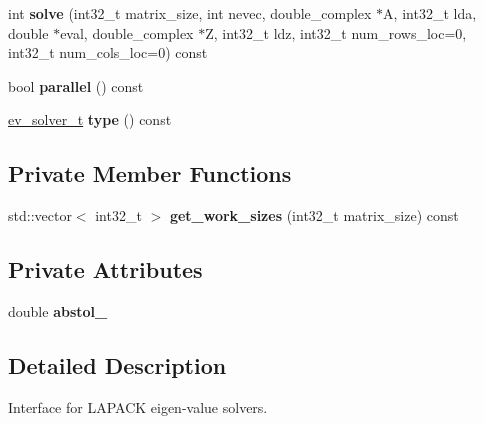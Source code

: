 \begin{DoxyCompactItemize}
\item 
\hypertarget{class_eigenproblem__lapack_a763608ccdddc644d840605a0627e00a1}{}int {\bfseries solve} (int32\+\_\+t matrix\+\_\+size, int nevec, double\+\_\+complex $\ast$A, int32\+\_\+t lda, double $\ast$eval, double\+\_\+complex $\ast$Z, int32\+\_\+t ldz, int32\+\_\+t num\+\_\+rows\+\_\+loc=0, int32\+\_\+t num\+\_\+cols\+\_\+loc=0) const \label{class_eigenproblem__lapack_a763608ccdddc644d840605a0627e00a1}

\item 
\hypertarget{class_eigenproblem__lapack_a50570856389dad526f5985ea3f14c431}{}bool {\bfseries parallel} () const \label{class_eigenproblem__lapack_a50570856389dad526f5985ea3f14c431}

\item 
\hypertarget{class_eigenproblem__lapack_adfdb06da092e1e7cca33e142ab5e47a1}{}\hyperlink{eigenproblem_8h_a203f2c57422a6e64834e6e9ab85982bf}{ev\+\_\+solver\+\_\+t} {\bfseries type} () const \label{class_eigenproblem__lapack_adfdb06da092e1e7cca33e142ab5e47a1}

\end{DoxyCompactItemize}
\subsection*{Private Member Functions}
\begin{DoxyCompactItemize}
\item 
\hypertarget{class_eigenproblem__lapack_a89e330901880cfc0b3403ad5f4436914}{}std\+::vector$<$ int32\+\_\+t $>$ {\bfseries get\+\_\+work\+\_\+sizes} (int32\+\_\+t matrix\+\_\+size) const \label{class_eigenproblem__lapack_a89e330901880cfc0b3403ad5f4436914}

\end{DoxyCompactItemize}
\subsection*{Private Attributes}
\begin{DoxyCompactItemize}
\item 
\hypertarget{class_eigenproblem__lapack_a9eeb004ed75ea889c3af921d7887fd3e}{}double {\bfseries abstol\+\_\+}\label{class_eigenproblem__lapack_a9eeb004ed75ea889c3af921d7887fd3e}

\end{DoxyCompactItemize}


\subsection{Detailed Description}
Interface for L\+A\+P\+A\+C\+K eigen-\/value solvers. 

